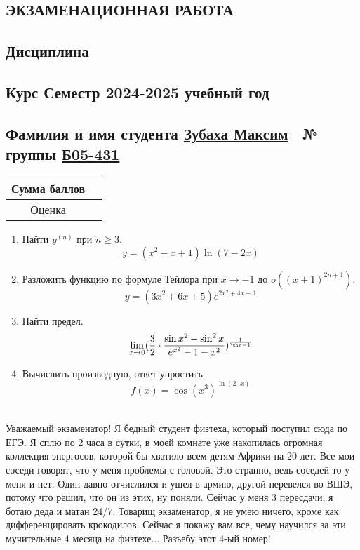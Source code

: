 \documentclass{article}
\begin{document}
\begin{Large}
\begin{onehalfspace}
\begin{center}
\section*{\huge ЭКЗАМЕНАЦИОННАЯ РАБОТА}
\subsection*{\large Дисциплина }
\subsection*{Курс  Семестр  2024-2025 учебный год}
\subsection*{Фамилия и имя студента \underline{Зубаха Максим}\ \hspace{2cm} № группы \underline{Б05-431}}
\begin{tabular}{|c|c|}
\hline 
Сумма баллов & \hspace{8cm} \\ 
\hline 
Оценка & \hspace{8cm} \\ 
\hline 
\end{tabular} 
\vspace{1cm} 
\hline 
\end{center} 
\begin{large} 
\begin{enumerate} 
\item Найти $y^{(n)}$ при $n \geq 3$. $$y = (x^2 - x + 1)\ln(7-2x)$$ 
\hline 
\item Разложить функцию по формуле Тейлора при $x \rightarrow -1$ до $o((x + 1)^{2n+1})$. $$y = (3x^2 + 6x + 5)e^{2x^2+4x-1}$$ 
\hline 
\item Найти предел. $$\lim\limits_{x \rightarrow 0}(\frac{3}{2} \cdot \frac{\sin{x^2} - \sin^2 x}{e^{x^2} - 1 - x^2})^{\frac{1}{\ch x - 1}}$$ 
\hline 
\item Вычислить производную, ответ упростить. 
$$ f(x) = \cos(x^{3})^{\ln(2 \cdot x)}$$\ \hline \
\end{enumerate}
\end{large}
Уважаемый экзаменатор! Я бедный студент физтеха, который поступил сюда по ЕГЭ. Я сплю по 2 часа в сутки, в моей комнате уже накопилась огромная коллекция энергосов, которой бы хватило всем детям Африки на 20 лет. Все мои соседи говорят, что у меня проблемы с головой. Это странно, ведь соседей то у меня и нет. Один давно отчислился и ушел в армию, другой перевелся во ВШЭ, потому что решил, что он из этих, ну поняли. Сейчас у меня 3 пересдачи, я ботаю деда и матан 24/7. Товарищ экзаменатор, я не умею ничего, кроме как дифференцировать крокодилов. Сейчас я покажу вам все, чему научился за эти мучительные 4 месяца на физтехе... Разъебу этот 4-ый номер!

\end{onehalfspace}
\end{Large}
\end{document}
